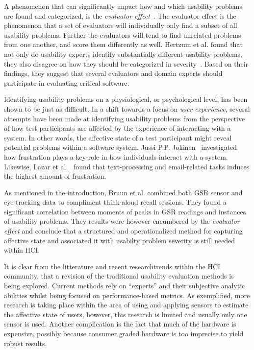 A phenomenon that can significantly impact how and which usability problems are
found and categorized, is the \textit{evaluator effect}~\cite{eval_effect}.
The evaluator effect is the phenomenon that a set of evaluators will individually only find a subset of all usability problems.
Further the evaluators will tend to find unrelated problems from one another, and score them differently as well.\cite{eval_effect}
Hertzum et al. found that not only do
usability experts identify substantially different usability problems, they also
disagree on how they should be categorized in
severity~\cite{eval_effect_research}. Based on their findings, they suggest that
several evaluators and domain experts should participate in evaluating critical
software.

Identifying usability problems on a physiological, or psychological level, has been shown to be just as difficult. In a
shift towards a focus on \textit{user experience}, several attempts have been made at identifying usability problems
from the perspective of how test participants are affected by the experience of interacting with a system. In other
words, the affective state of a test participant might reveal potential problems within a software system. Jussi
P.P. Jokinen~\cite{workplace_up_study} investigated how frustration plays a key-role in how individuals interact with a
system. Likewise, Lazar et al.~\cite{frustration_with_computers} found that text-processing and email-related tasks
induces the highest amount of frustration.

As mentioned in the introduction, Bruun et al. combined both GSR sensor and
eye-tracking data to compliment think-aloud recall sessions. They found a
significant correlation between moments of peaks in GSR readings and instances
of usability problems. They results were however encumbered by the
\textit{evaluator effect} and conclude that a structured and operationalized
method for capturing affective state and associated it with usabilty problem
severity is still needed within HCI.

It is clear from the litterature and recent researchtrends within the HCI community, that a revision of the traditional usability evaluation methods is being explored. 
Current methods rely on ``experts'' and their subjective analytic abilities whilst being focused on performance-based metrics.
As exemplified, more research is taking place within the area of using and applying sensors to estimate the affective state of users, however, this research is limited and usually only one sensor is used. 
Another complication is the fact that much of the hardware is expensive, possibly because consumer graded hardware is too imprecise to yield robust results.

